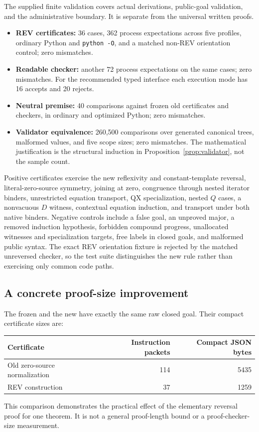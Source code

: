 The supplied finite validation covers actual derivations, public-goal
validation, and the administrative boundary. It is separate from the
universal written proofs.
\begin{itemize}
\item \textbf{REV certificates:} 36 cases, 362 process expectations across
  five profiles, ordinary Python and \texttt{python -O}, and a matched
  non-REV orientation control; zero mismatches.
\item \textbf{Readable checker:} another 72 process expectations on the
  same cases; zero mismatches. For the recommended typed interface each
  execution mode has 16 accepts and 20 rejects.
\item \textbf{Neutral premise:} 40 comparisons against frozen old
  certificates and checkers, in ordinary and optimized Python; zero
  mismatches.
\item \textbf{Validator equivalence:} 260,500 comparisons over generated
  canonical trees, malformed values, and five scope sizes; zero
  mismatches. The mathematical justification is the structural induction
  in Proposition~\ref{prop:validator}, not the sample count.
\end{itemize}

Positive certificates exercise the new reflexivity and constant-template
reversal, literal-zero-source symmetry, joining at zero, congruence
through nested iterator binders, unrestricted equation transport, QX
specialization, nested $Q$ cases, a nonvacuous $D$ witness, contextual
equation induction, and transport under both native binders. Negative
controls include a false goal, an unproved major, a removed induction
hypothesis, forbidden compound progress, unallocated witnesses and
specialization targets, free labels in closed goals, and malformed
public syntax. The exact REV orientation fixture is rejected by the
matched unreversed checker, so the test suite distinguishes the new
rule rather than exercising only common code paths.

\subsection{A concrete proof-size improvement}

The frozen  and the new
 have exactly the same raw closed
goal. Their compact certificate sizes are:
\begin{center}\small
\begin{tabular}{@{}lrr@{}}
\toprule
Certificate & Instruction packets & Compact JSON bytes\\
\midrule
Old zero-source normalization & 114 & 5435\\
REV construction & 37 & 1259\\
\bottomrule
\end{tabular}
\end{center}
This comparison demonstrates the practical effect of the elementary
reversal proof for one theorem. It is not a general proof-length bound
or a proof-checker-size measurement.

